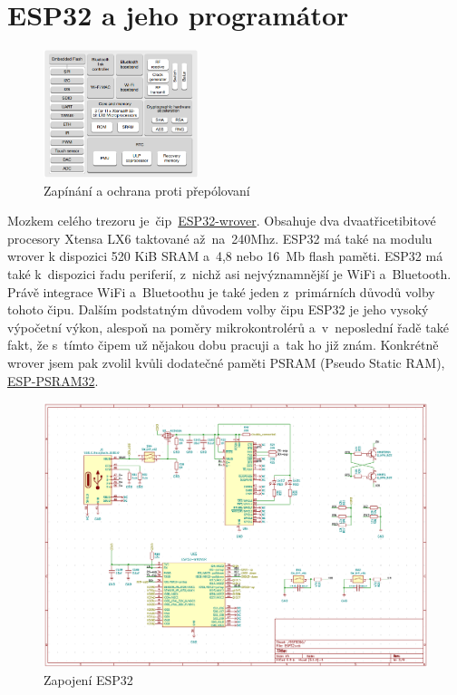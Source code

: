 \section{ESP32 a jeho programátor}


\begin{figure}
    \centering
    \includegraphics[width=0.4\textwidth]{kapitoly/obrazky/E4/ESP32/BlockDiagram.png}
    \caption{\label{fig:E4-ESP32-BlockDiagram}Zapínání a ochrana proti přepólovaní}
\end{figure}

Mozkem celého trezoru je~čip~\href{https://www.espressif.com/sites/default/files/documentation/esp32-wrover-b_datasheet_en.pdf}{ESP32-wrover}. 
Obsahuje dva dvaatřicetibitové procesory Xtensa LX6 taktované až~na~240Mhz. ESP32 má také na modulu wrover k dispozici 520 KiB SRAM 
a~4,8 nebo 16~Mb flash paměti. ESP32 má také k~dispozici řadu periferií, z~nichž asi nejvýznamnější je WiFi a~Bluetooth. Právě integrace 
WiFi a~Bluetoothu je také jeden z~primárních důvodů volby tohoto čipu. Dalším podstatným důvodem volby čipu ESP32 je jeho vysoký výpočetní výkon, 
alespoň na poměry mikrokontrolérů a~v~neposlední řadě také fakt, že s~tímto čipem už nějakou dobu pracuji a~tak ho již znám. Konkrétně wrover 
jsem pak zvolil kvůli dodatečné paměti PSRAM (Pseudo Static RAM), \href{http://gamma.spb.ru/images/pdf/esp-psram32_datasheet_en.pdf}{ESP-PSRAM32}.


\begin{figure}[htbp] %
    \centering
    \includegraphics[width=\textwidth]{kapitoly/obrazky/E4/ESP32/sch.png}
    \caption{Zapojení ESP32}
    \label{fig:E4-step-up}
\end{figure}

